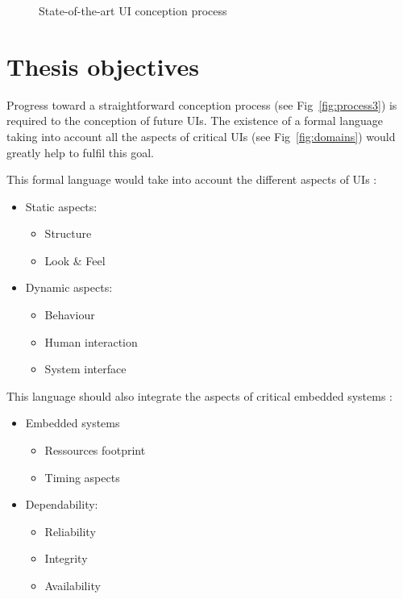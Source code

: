 \documentclass{jdt-tis}
\begin{document}
\begin{content}
\begin{figure}[H]
{\begin{tikzpicture}
\end{tikzpicture}

}

\caption{State-of-the-art UI conception process}
\label{fig:process2}
\end{figure}


 \section{Thesis objectives}
Progress toward a straightforward conception process (see Fig~\ref{fig:process3}) is required to the conception of future UIs. The existence of a formal language taking into account all the aspects of critical UIs (see Fig~\ref{fig:domains}) would greatly help to fulfil this goal.

This formal language would take into account the different aspects of UIs :
\begin{itemize}
\item{Static aspects:}
	\begin{itemize}
	\item{Structure}
	\item{Look \& Feel}
	\end{itemize}
\item{Dynamic aspects:} 
\begin{itemize}
	\item{Behaviour}
	\item{Human interaction}
	\item{System interface}
\end{itemize}
\end{itemize}

This language should also integrate the aspects of critical embedded systems :
\begin{itemize}
\item{Embedded systems}
	\begin{itemize}
	\item{Ressources footprint}
	\item{Timing aspects}
	\end{itemize}
\item{Dependability:} 
\begin{itemize}
	\item{Reliability}
	\item{Integrity}
	\item{Availability}
\end{itemize}
\end{itemize}





\end{content}
\end{document}
